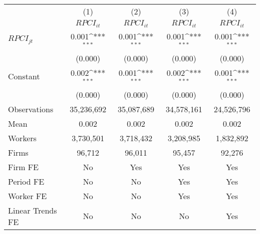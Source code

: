 {
\def\sym#1{\ifmmode^{#1}\else\(^{#1}\)\fi}
\begin{tabular}{l*{4}{c}}
\hline\hline
                    &\multicolumn{1}{c}{(1)}&\multicolumn{1}{c}{(2)}&\multicolumn{1}{c}{(3)}&\multicolumn{1}{c}{(4)}\\
                    &\multicolumn{1}{c}{$RPCI_{it}$}&\multicolumn{1}{c}{$RPCI_{it}$}&\multicolumn{1}{c}{$RPCI_{it}$}&\multicolumn{1}{c}{$RPCI_{it}$}\\
\hline
$RPCI_{jt}$         &       0.001\sym{***}&       0.001\sym{***}&       0.001\sym{***}&       0.001\sym{***}\\
                    &     (0.000)         &     (0.000)         &     (0.000)         &     (0.000)         \\
[1em]
Constant            &       0.002\sym{***}&       0.001\sym{***}&       0.002\sym{***}&       0.001\sym{***}\\
                    &     (0.000)         &     (0.000)         &     (0.000)         &     (0.000)         \\
\hline
Observations        &  35,236,692         &  35,087,689         &  34,578,161         &  24,526,796         \\
Mean                &       0.002         &       0.002         &       0.002         &       0.002         \\
Workers             &   3,730,501         &   3,718,432         &   3,208,985         &   1,832,892         \\
Firms               &      96,712         &      96,011         &      95,457         &      92,276         \\
Firm FE             &          No         &         Yes         &         Yes         &         Yes         \\
Period FE           &          No         &          No         &         Yes         &         Yes         \\
Worker FE           &          No         &          No         &         Yes         &         Yes         \\
Linear Trends FE    &          No         &          No         &          No         &         Yes         \\
\hline\hline
\end{tabular}
}

